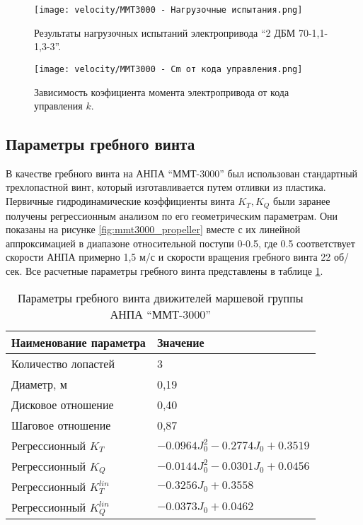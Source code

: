 \begin{figure}[ht]
    \centering
    \texttt{[image: velocity/MMT3000 - Нагрузочные испытания.png]}
    \caption{Результаты нагрузочных испытаний электропривода ``2 ДБМ 70-1,1-1,3-3''.}
    \label{fig:motor_load_test}
\end{figure}

\begin{figure}[ht]
    \centering
    \texttt{[image: velocity/MMT3000 - Cm от кода управления.png]}
    \caption{Зависимость коэфициента момента электропривода от кода управления $k$.}
    \label{fig:function_cm}
\end{figure}

\subsection{Параметры гребного винта}
В качестве гребного винта на АНПА ``ММТ-3000'' был использован стандартный трехлопастной винт, который изготавливается путем отливки из пластика.
Первичные гидродинамические коэффициенты винта $K_T, K_Q$ были заранее получены регрессионным анализом по его геометрическим параметрам.
Они показаны на рисунке \ref{fig:mmt3000_propeller} вместе с их линейной аппроксимацией в диапазоне относительной поступи 0-0.5, где 0.5 соответствует скорости АНПА примерно 1,5 м/с и скорости вращения гребного винта 22 об/сек.
Все расчетные параметры гребного винта представлены в таблице \ref{tab:mmt3000_propeller}.

\begin{table}
    \caption{Параметры гребного винта движителей маршевой группы АНПА ``ММТ-3000''
    }
    \label{tab:mmt3000_propeller}
    \centering
    \begin{tabular}{ll}
        \toprule
        Наименование параметра  & Значение\\
        \midrule
        Количество лопастей & 3 \\
        Диаметр, м & 0,19 \\
        Дисковое отношение & 0,40 \\
        Шаговое отношение & 0,87 \\
        Регрессионный $K_T$ & $-0.0964J_0^2 -0.2774J_0 + 0.3519$ \\
        Регрессионный $K_Q$ & $-0.0144J_0^2 -0.0301J_0 + 0.0456$ \\
        Регрессионный $K_T^{lin}$ & $-0.3256J_0 + 0.3558$ \\
        Регрессионный $K_Q^{lin}$ & $-0.0373J_0 + 0.0462$ \\
        \bottomrule
    \end{tabular}
\end{table}

